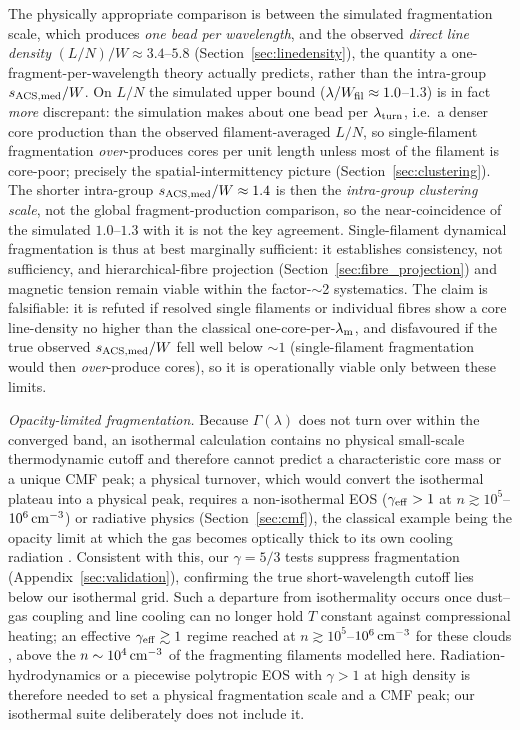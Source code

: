 \documentclass[usenatbib,twoside,twocolumn]{mnras}
\begin{document}
The physically appropriate comparison is between the simulated fragmentation scale, which produces \emph{one bead per wavelength}, and the observed \emph{direct line density} $(L/N)/W\approx3.4$--$5.8$ (Section~\ref{sec:linedensity}), the quantity a one-fragment-per-wavelength theory actually predicts, rather than the intra-group $s_{\rm ACS,med}/W$. On $L/N$ the simulated upper bound ($\lambda/W_{\rm fil}\approx1.0$--$1.3$) is in fact \emph{more} discrepant: the simulation makes about one bead per $\lambda_{\rm turn}$, i.e.\ a denser core production than the observed filament-averaged $L/N$, so single-filament fragmentation \emph{over}-produces cores per unit length unless most of the filament is core-poor; precisely the spatial-intermittency picture (Section~\ref{sec:clustering}). The shorter intra-group $s_{\rm ACS,med}/W\approx1.4$ is then the \emph{intra-group clustering scale}, not the global fragment-production comparison, so the near-coincidence of the simulated $1.0$--$1.3$ with it is not the key agreement. Single-filament dynamical fragmentation is thus at best marginally sufficient: it establishes consistency, not sufficiency, and hierarchical-fibre projection (Section~\ref{sec:fibre_projection}) and magnetic tension remain viable within the factor-$\sim$2 systematics. The claim is falsifiable: it is refuted if resolved single filaments or individual fibres show a core line-density no higher than the classical one-core-per-$\lambda_{\rm m}$, and disfavoured if the true observed $s_{\rm ACS,med}/W$ fell well below $\sim1$ (single-filament fragmentation would then \emph{over}-produce cores), so it is operationally viable only between these limits.

\emph{Opacity-limited fragmentation.} Because $\Gamma(\lambda)$ does not turn over within the converged band, an isothermal calculation contains no physical small-scale thermodynamic cutoff and therefore cannot predict a characteristic core mass or a unique CMF peak; a physical turnover, which would convert the isothermal plateau into a physical peak, requires a non-isothermal EOS ($\gamma_{\rm eff}>1$ at $n\gtrsim10^{5}$--$10^{6}\,{\rm cm^{-3}}$) or radiative physics (Section~\ref{sec:cmf}), the classical example being the opacity limit at which the gas becomes optically thick to its own cooling radiation \citep{Rees1976,LowLyndenBell1976}. Consistent with this, our $\gamma=5/3$ tests suppress fragmentation (Appendix~\ref{sec:validation}), confirming the true short-wavelength cutoff lies below our isothermal grid. Such a departure from isothermality occurs once dust--gas coupling and line cooling can no longer hold $T$ constant against compressional heating; an effective $\gamma_{\rm eff}\gtrsim1$ regime reached at $n\gtrsim10^{5}$--$10^{6}\,{\rm cm^{-3}}$ for these clouds \citep{Larson1985,Glover2012}, above the $n\sim10^{4}\,{\rm cm^{-3}}$ of the fragmenting filaments modelled here. Radiation-hydrodynamics or a piecewise polytropic EOS with $\gamma>1$ at high density is therefore needed to set a physical fragmentation scale and a CMF peak; our isothermal suite deliberately does not include it.
\end{document}
